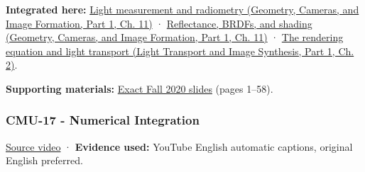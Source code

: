 \textbf{Integrated here:} \href{../03-Geometry-Cameras-and-Image-Formation-P01/main.pdf\#03-visual-computing-i-ch004-light-measurement-and-radiometry}{Light measurement and radiometry (Geometry, Cameras, and Image Formation, Part 1, Ch. 11)} · \href{../03-Geometry-Cameras-and-Image-Formation-P01/main.pdf\#03-visual-computing-i-ch004-reflectance-brdfs-and-shading}{Reflectance, BRDFs, and shading (Geometry, Cameras, and Image Formation, Part 1, Ch. 11)} · \href{../04-Light-Transport-and-Image-Synthesis-P01/main.pdf\#03-visual-computing-i-ch007-the-rendering-equation-and-light-transport}{The rendering equation and light transport (Light Transport and Image Synthesis, Part 1, Ch. 2)}.

\textbf{Supporting materials:} \href{https://15462.courses.cs.cmu.edu/fall2020content/lectures/16_renderingequation/16_renderingequation_slides.pdf}{Exact Fall 2020 slides} (pages 1--58).

\subsubsection{CMU-17 - Numerical Integration}\label{04-visual-computing-ii-ch036-cmu-17---numerical-integration}

\hypertarget{04-visual-computing-ii-ch036-cmu-17---numerical-integration}{}

\href{https://www.youtube.com/watch?v=EGNZm9m382s}{Source video} · \textbf{Evidence used:} YouTube English automatic captions, original English preferred.

